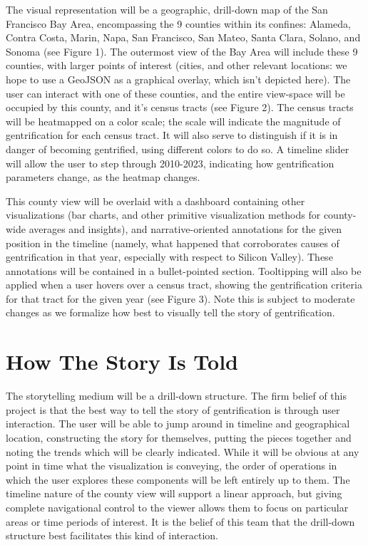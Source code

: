 \documentclass{article}
\begin{document}
The visual representation will be a geographic, drill-down map of the San Francisco Bay Area, encompassing the 9 counties within its confines: Alameda, Contra Costa, Marin, Napa, San Francisco, San Mateo, Santa Clara, Solano, and Sonoma (see Figure 1). The outermost view of the Bay Area will include these 9 counties, with larger points of interest (cities, and other relevant locations: we hope to use a GeoJSON as a graphical overlay, which isn't depicted here). The user can interact with one of these counties, and the entire view-space will be occupied by this county, and it's census tracts (see Figure 2). The census tracts will be heatmapped on a color scale; the scale will indicate the magnitude of gentrification for each census tract. It will also serve to distinguish if it is in danger of becoming gentrified, using different colors to do so. A timeline slider will allow the user to step through 2010-2023, indicating how gentrification parameters change, as the heatmap changes.

This county view will be overlaid with a dashboard containing other visualizations (bar charts, and other primitive visualization methods for county-wide averages and insights), and narrative-oriented annotations for the given position in the timeline (namely, what happened that corroborates causes of gentrification in that year, especially with respect to Silicon Valley). These annotations will be contained in a bullet-pointed section. Tooltipping will also be applied when a user hovers over a census tract, showing the gentrification criteria for that tract for the given year (see Figure 3). Note this is subject to moderate changes as we formalize how best to visually tell the story of gentrification.

\section{How The Story Is Told}

The storytelling medium will be a drill-down structure. The firm belief of this project is that the best way to tell the story of gentrification is through user interaction. The user will be able to jump around in timeline and geographical location, constructing the story for themselves, putting the pieces together and noting the trends which will be clearly indicated. While it will be obvious at any point in time what the visualization is conveying, the order of operations in which the user explores these components will be left entirely up to them. The timeline nature of the county view will support a linear approach, but giving complete navigational control to the viewer allows them to focus on particular areas or time periods of interest. It is the belief of this team that the drill-down structure best facilitates this kind of interaction. 
\end{document}
